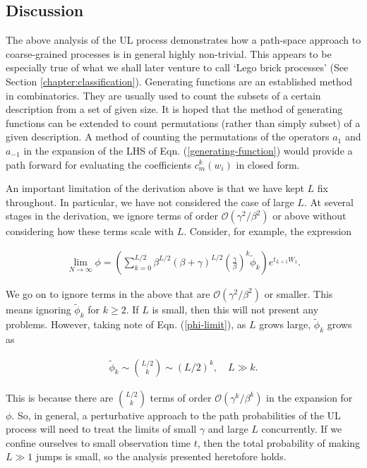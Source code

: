 \subsection{Discussion}
The above analysis of the UL process demonstrates how a path-space approach to coarse-grained processes is in general highly non-trivial. This appears to be especially true of what we shall later venture to call `Lego brick processes' (See Section \ref{chapter:classification}).
Generating functions are an established method in combinatorics. They are usually used to count the subsets of a certain description from a set of given size. It is hoped that the method of generating functions can be extended to count permutations (rather than simply subset) of a given description. A method of counting the permutations of the operators $a_1$ and $a_{-1}$ in the expansion of the LHS of Eqn. (\ref{generating-function}) would provide a path forward for evaluating the coefficients $c^k_m(w_i)$ in closed form. 

An important limitation of the derivation above is that we have kept $L$ fix throughout. In particular, we have not considered the case of large $L$. At several stages in the derivation, we ignore terms of order $\mathcal{O}(\gamma^2/\beta^2)$ or above without considering how these terms scale with $L$. Consider, for example, the expression 

\begin{align}
\lim_{N\rightarrow \infty}\phi = \left(\sum_{k=0}^{L/2} \beta^{L/2}(\beta +\gamma)^{L/2}\left(\frac{\gamma}{\beta}\right)^k\tilde{\phi}_k\right) e^{t_{L+1} W_1}.
\end{align}

We go on to ignore terms in the above that are $\mathcal{O}(\gamma^2/\beta^2)$ or smaller. This means ignoring $\tilde{\phi}_{k}$ for $k \geq 2$. If $L$ is small, then this will not present any problems. However, taking note of Eqn. (\ref{phi-limit}), as $L$ grows large, $\tilde{\phi}_k$ grows as 

\begin{align}
\tilde{\phi}_k \sim \binom{L/2}{k} \sim (L/2)^k, \quad L \gg k.
\end{align}

This is because there are $\binom{L/2}{k}$ terms of order $\mathcal{O}(\gamma^k/\beta^k)$ in the expansion for $\phi$. So, in general, a perturbative approach to the path probabilities of the UL process will need to treat the limits of small $\gamma$ and large $L$ concurrently. If we confine ourselves to small observation time $t$, then the total probability of making $L \gg 1$ jumps is small, so the analysis presented heretofore holds. \newpage